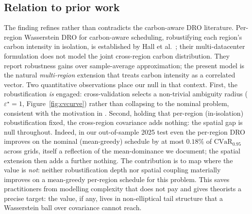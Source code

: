 \documentclass[10pt,twocolumn]{article}
\newcommand{\CVaR}{\mathrm{CVaR}}
\begin{document}
\subsection{Relation to prior work}
The finding refines rather than contradicts the carbon-aware DRO literature.
Per-region Wasserstein DRO for carbon-aware scheduling, robustifying each region's
carbon intensity in isolation, is established by
Hall et al.~\citep{hall2024}; their multi-datacenter formulation does not model the
joint cross-region carbon distribution. They report robustness gains over
sample-average approximation; the present model is the natural \emph{multi-region}
extension that treats carbon intensity as a correlated vector. Two quantitative
observations place our null in that context. First, the robustification \emph{is}
engaged: cross-validation selects a non-trivial ambiguity radius
($\varepsilon^\star=1$, Figure~\ref{fig:cvcurve}) rather than collapsing to the
nominal problem, consistent with the motivation in \citep{hall2024}. Second, holding
that per-region (in-isolation) robustification fixed, the cross-region covariance adds
nothing: the spatial gap is null throughout. Indeed, in our out-of-sample 2025 test
even the per-region DRO improves on the nominal (mean-greedy) schedule by at most $0.18\%$
of $\CVaR_{0.95}$ across grids, itself a reflection of the mean-dominance we
document; the spatial extension then adds a further nothing. The contribution is to
map where the value is \emph{not}: neither robustification depth nor spatial
coupling materially improves on a mean-greedy per-region schedule for this problem.
This saves practitioners from modelling complexity that does not pay and gives
theorists a precise target: the value, if any, lives in non-elliptical tail
structure that a Wasserstein ball over covariance cannot reach.
\end{document}
